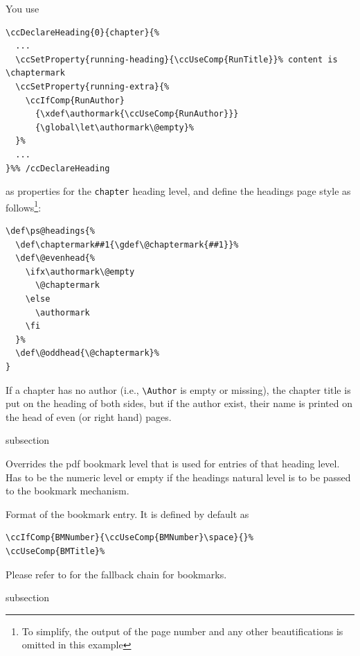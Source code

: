 You use
\begin{lstlisting}
\ccDeclareHeading{0}{chapter}{%
  ...
  \ccSetProperty{running-heading}{\ccUseComp{RunTitle}}% content is  \chaptermark
  \ccSetProperty{running-extra}{%
    \ccIfComp{RunAuthor}
      {\xdef\authormark{\ccUseComp{RunAuthor}}}
      {\global\let\authormark\@empty}%
  }%
  ...
}%% /ccDeclareHeading
\end{lstlisting}
as properties for the \lstinline{chapter} heading level, and define
the headings page style as follows\footnote{To simplify, the output of
  the page number and any other beautifications is omitted in this
  example}:
\begin{lstlisting}
\def\ps@headings{%
  \def\chaptermark##1{\gdef\@chaptermark{##1}}%
  \def\@evenhead{%
    \ifx\authormark\@empty
      \@chaptermark
    \else
      \authormark
    \fi
  }%
  \def\@oddhead{\@chaptermark}%
}
\end{lstlisting}
If a chapter has no author (i.e.,
\lstinline{\Author} is empty or missing), the chapter title is put
on the heading of both sides, but if the author exist, their name is
printed on the head of even (or right hand) pages.


\begin{Heading}[label=sec:hdg:bkm]{subsection}
\end{Heading}


%

Overrides the pdf bookmark level that is used for entries of that
heading level. Has to be the numeric level or empty if the headings
natural level is to be passed to the bookmark mechanism.


Format of the bookmark entry. It is defined by default as
\begin{lstlisting}[style=tex]
\ccIfComp{BMNumber}{\ccUseComp{BMNumber}\space}{}%
\ccUseComp{BMTitle}%
\end{lstlisting}
Please refer to  for the fallback
chain for bookmarks.

\begin{Heading}[label=sec:hdg:toc]{subsection}
\end{Heading}

